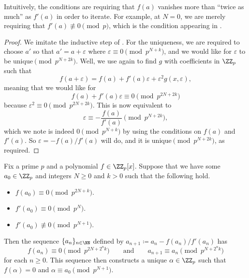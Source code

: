 \documentclass[../notes.tex]{subfiles}
\begin{document}
Intuitively, the conditions are requiring that $f(a)$ vanishes more than ``twice as much'' as $f'(a)$ in order to iterate. For example, at $N=0$, we are merely requiring that $f'(a)\not\equiv0\pmod p$, which is the condition appearing in .
\begin{proof}
	We imitate the inductive step of . For the uniqueness, we are required to choose $a'$ so that $a'=a+\varepsilon$ where $\varepsilon\equiv0\pmod{p^{N+k}}$, and we would like for $\varepsilon$ to be unique$\pmod{p^{N+2k}}$. Well, we use  again to find $g$ with coefficients in $\ZZ_p$ such that
	\[f(a+\varepsilon)=f(a)+f'(a)\varepsilon+\varepsilon^2g(x,\varepsilon),\]
	meaning that we would like for
	\[f(a)+f'(a)\varepsilon\equiv0\pmod{p^{2N+2k}}\]
	because $\varepsilon^2\equiv0\pmod{p^{2N+2k}}$. This is now equivalent to
	\[\varepsilon\equiv-\frac{f(a)}{f'(a)}\pmod{p^{N+2k}},\]
	which we note is indeed $0\pmod{p^{N+k}}$ by using the conditions on $f(a)$ and $f'(a)$. So $\varepsilon=-f(a)/f'(a)$ will do, and it is unique$\pmod{p^{N+2k}}$, as required.
\end{proof}
\begin{proposition} \label{prop:hensel-by-newton}
	Fix a prime $p$ and a polynomial $f\in\ZZ_p[x]$. Suppose that we have some $a_0\in\ZZ_p$ and integers $N\ge0$ and $k>0$ such that the following hold.
	\begin{itemize}
		\item $f(a_0)\equiv0\pmod{p^{2N+k}}$.
		\item $f'(a_0)\equiv0\pmod{p^{N}}$.
		\item $f'(a_0)\not\equiv0\pmod{p^{N+1}}$.
	\end{itemize}
	Then the sequence $\{a_n\}_{n\in\NN}$ defined by $a_{n+1}\coloneqq a_n-f(a_n)/f'(a_n)$ has
	\[f(a_n)\equiv0\pmod{p^{2N+2^nk}}\qquad\text{and}\qquad a_{n+1}\equiv a_n\pmod{p^{N+2^nk}}\]
	for each $n\ge0$. This sequence then constructs a unique $\alpha\in\ZZ_p$ such that $f(\alpha)=0$ and $\alpha\equiv a_0\pmod{p^{N+1}}$.
\end{proposition}
\end{document}
